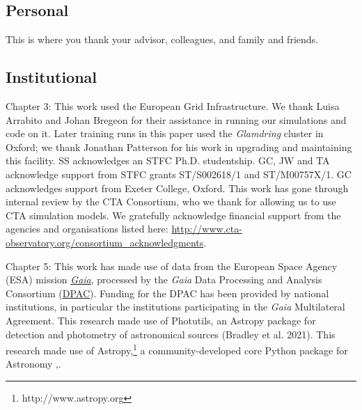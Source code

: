 \subsection*{Personal}

This is where you thank your advisor, colleagues, and family and friends.

\subsection*{Institutional}

Chapter 3: This work used the European Grid Infrastructure. We thank Luisa Arrabito and Johan Bregeon for their assistance in running our simulations and code on it. Later training runs in this paper used the \textit{Glamdring} cluster in Oxford; we thank Jonathan Patterson for his work in upgrading and maintaining this facility. SS acknowledges an STFC Ph.D. studentship. GC, JW and TA acknowledge support from STFC grants ST/S002618/1 and ST/M00757X/1. GC acknowledges support from Exeter College, Oxford. This work has gone through internal review by the CTA Consortium, who we thank for allowing us to use CTA simulation models. We gratefully acknowledge financial support from the agencies and organisations listed here: \url{http://www.cta-observatory.org/consortium\_acknowledgments}.

Chapter 5:
This work has made use of data from the European Space Agency (ESA) mission \href{https://www.cosmos.esa.int/gaia}{\textit{Gaia}}, processed by the \textit{Gaia} Data Processing and Analysis Consortium (\href{https://www.cosmos.esa.int/web/gaia/dpac/consortium}{DPAC}). Funding for the DPAC has been provided by national institutions, in particular the institutions participating in the \textit{Gaia} Multilateral Agreement. This research made use of Photutils, an Astropy package for detection and photometry of astronomical sources (Bradley et al.
2021). This research made use of Astropy,\footnote{http://www.astropy.org} a community-developed core Python package for Astronomy \cite{astropy:2013},\cite{astropy:2018}.

